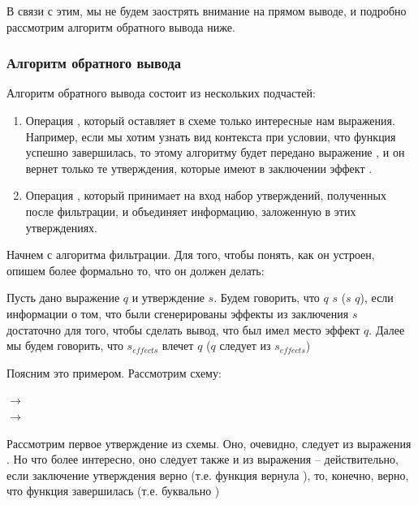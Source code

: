 В связи с этим, мы не будем заострять внимание на прямом выводе, и подробно рассмотрим алгоритм обратного вывода ниже.


\subsubsection{Алгоритм обратного вывода}

\label{section-back-inference}

Алгоритм обратного вывода состоит из нескольких подчастей:

\begin{enumerate}
    \item Операция , который оставляет в схеме только интересные нам выражения. Например, если мы хотим узнать вид контекста при условии, что функция успешно завершилась, то этому алгоритму будет передано выражение , и он вернет только те утверждения, которые имеют в заключении эффект . 
    
    \item Операция , который принимает на вход набор утверждений, полученных после фильтрации, и объединяет информацию, заложенную в этих утверждениях. 
\end{enumerate}

Начнем с алгоритма фильтрации. Для того, чтобы понять, как он устроен, опишем более формально то, что он должен делать:

\begin{definition}
    Пусть дано выражение $q$ и утверждение $s$. Будем говорить, что $q$  $s$ ($s$  $q$), если информации о том, что были сгенерированы эффекты из заключения $s$ достаточно для того, чтобы сделать вывод, что был имел место эффект $q$. Далее мы будем говорить, что $s_{effects}$ влечет $q$ ($q$ следует из $s_{effects}$)
\end{definition}

Поясним это примером. Рассмотрим схему:

{
     $\rightarrow$  \\
     $\rightarrow$ 
}{}

Рассмотрим первое утверждение из схемы. Оно, очевидно, следует из выражения . Но что более интересно, оно следует также и из выражения  -- действительно, если заключение утверждения верно (т.е. функция вернула ), то, конечно, верно, что функция завершилась (т.е. буквально )




